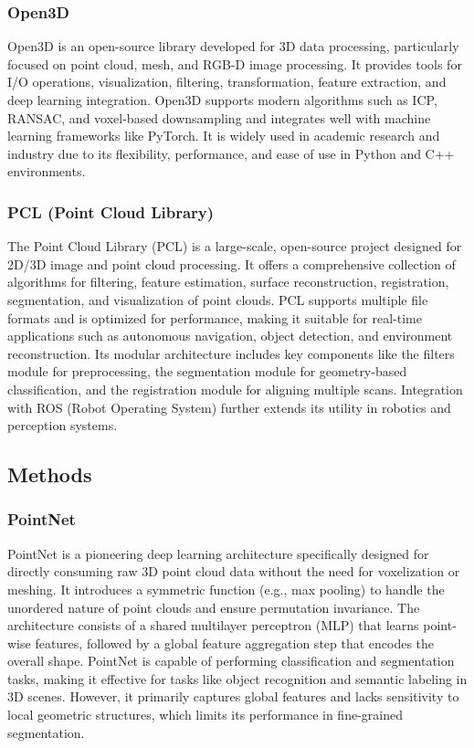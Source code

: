\documentclass[../report.tex]{subfiles}
\begin{document}
    \subsubsection{\textbf{Open3D}}
    
    Open3D\cite{Open3D_Library} is an open-source library developed for 3D data processing, particularly focused on point cloud, mesh, and RGB-D image processing. It provides tools for I/O operations, visualization, filtering, transformation, feature extraction, and deep learning integration. Open3D supports modern algorithms such as ICP, RANSAC, and voxel-based downsampling and integrates well with machine learning frameworks like PyTorch. It is widely used in academic research and industry due to its flexibility, performance, and ease of use in Python and C++ environments.
    
    \subsubsection{\textbf{PCL} (Point Cloud Library)}
    
    The Point Cloud Library\cite{PCL} (PCL) is a large-scale, open-source project designed for 2D/3D image and point cloud processing. It offers a comprehensive collection of algorithms for filtering, feature estimation, surface reconstruction, registration, segmentation, and visualization of point clouds. PCL supports multiple file formats and is optimized for performance, making it suitable for real-time applications such as autonomous navigation, object detection, and environment reconstruction. Its modular architecture includes key components like the filters module for preprocessing, the segmentation module for geometry-based classification, and the registration module for aligning multiple scans. Integration with ROS (Robot Operating System) further extends its utility in robotics and perception systems.
    
    \subsection{Methods}
    \subsubsection{\textbf{PointNet}}
    
    PointNet\cite{PointNet} is a pioneering deep learning architecture specifically designed for directly consuming raw 3D point cloud data without the need for voxelization or meshing. It introduces a symmetric function (e.g., max pooling) to handle the unordered nature of point clouds and ensure permutation invariance. The architecture consists of a shared multilayer perceptron (MLP) that learns point-wise features, followed by a global feature aggregation step that encodes the overall shape. PointNet is capable of performing classification and segmentation tasks, making it effective for tasks like object recognition and semantic labeling in 3D scenes. However, it primarily captures global features and lacks sensitivity to local geometric structures, which limits its performance in fine-grained segmentation.
    
\end{document}
